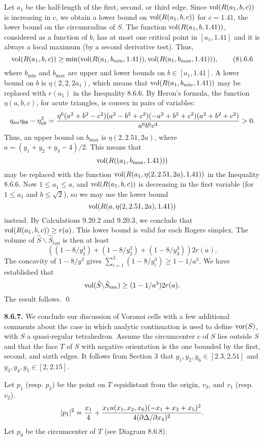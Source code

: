 Let $a_1$ be the half-length of the first, second, or
third edge.
Since $\hbox{vol}(R(a_1,b,c))$ is increasing in $c$, we obtain a lower bound
on $\hbox{vol}(R(a_1,b,c))$ for $c=1.41$, the
lower bound on the circumradius of $S$.  
The function $\hbox{vol}(R(a_1,b,1.41))$,  
considered as a function of $b$, has
at most one critical point in $[a_1,1.41]$ and it is always
a local maximum (by a second derivative test).  
  Thus, 
$$\Vol(R(a_1,b,c))\ge 
   \min(\Vol(R(a_1,b_{\min},1.41)),
   \Vol(R(a_1,b_{\max},1.41))),\tag8.6.6$$
where $b_{\min}$ and $b_{\max}$ are upper and lower bounds
on $b\in[a_1,1.41]$.  A lower bound on $b$ is $\eta(2,2,2a_1)$,
which means that $\hbox{vol}(R(a_1,b_{\min},1.41))$ may be replaced
with $r(a_1)$ in the Inequality 8.6.6.
By Heron's formula, the function $\eta(a,b,c)$, for acute
triangles, is convex in pairs of variables:
$$
\eta_{aa}\eta_{bb}-\eta_{ab}^2=
{\eta^6 (a^2+b^2-c^2)(a^2-b^2+c^2)(-a^2+b^2+c^2)(a^2+b^2+c^2)
\over a^6b^6c^4}>0.$$
Thus, 
an upper bound on $b_{\max}$ is $\eta(2,2.51,2a)$, where
$a = (y_1+y_2+y_3-4)/2$.  This means
that $$\hbox{vol}(R((a_1,b_{\max},1.41)))$$ may be replaced with
the function
$\hbox{vol}(R(a_1,\eta(2,2.51,2a),1.41))$ in the Inequality 8.6.6.
Now $1\le a_1\le a$, and $\hbox{vol}(R(a_1,b,c))$ 
is decreasing in the first variable
(for $1\le a_1$ and $b\le \sqrt{2}$), so we may use
the lower bound $$\hbox{vol}(R(a,\eta(2,2.51,2a),1.41))$$ instead.
By  Calculations 9.20.2 and 9.20.3,
we conclude that $\hbox{vol}(R(a_1,b,c))\ge r(a)$.
This lower bound is valid
for each Rogers simplex.  The volume of 
$\hat S\backslash \hat S_{{\tan}}$
is then at least
$$((1-8/y_1^3) + (1-8/y_2^3) + (1-8/y_3^3))2r(a).
$$
The concavity
of $1-8/y^3$ gives $\sum_{i=1}^3 
(1- 8/y_i^3)\ge 1-1/a^3$.
We have established that 
$$\hbox{vol}(\hat S\backslash \hat S_{{\tan}})\ge (1-1/a^3) 2
r(a).$$
The result follows.  \qed



{\bf 8.6.7.}  We conclude our discussion of Voronoi cells with
a few additional comments about the case in which analytic
continuation is used to define $\operatorname{vor}(S)$, with $S$  a
quasi-regular tetrahedron.  Assume the circumcenter $c$ of $S$
lies outside $S$ and that the face $T$ of $S$ with negative
orientation is the one bounded by the first, second, and sixth
edges.  It follows from Section 3 that $y_1, y_2, y_6\in[2.3,2.51]$
and $y_3, y_4, y_5\in[2,2.15]$.

Let $p_1$ (resp. $p_2$) be the point on $T$ equidistant from
the origin, $v_3$, and $v_1$ (resp. $v_2$).
$$|p_1|^2 = 
{x_1\over 4} + {x_1 u(x_1,x_2,x_6)(-x_1+x_3+x_5)^2\over
4 (\partial\Delta/\partial x_4)^2}.$$
Let $p_0$ be the circumcenter of $T$ (see Diagram 8.6.8).

